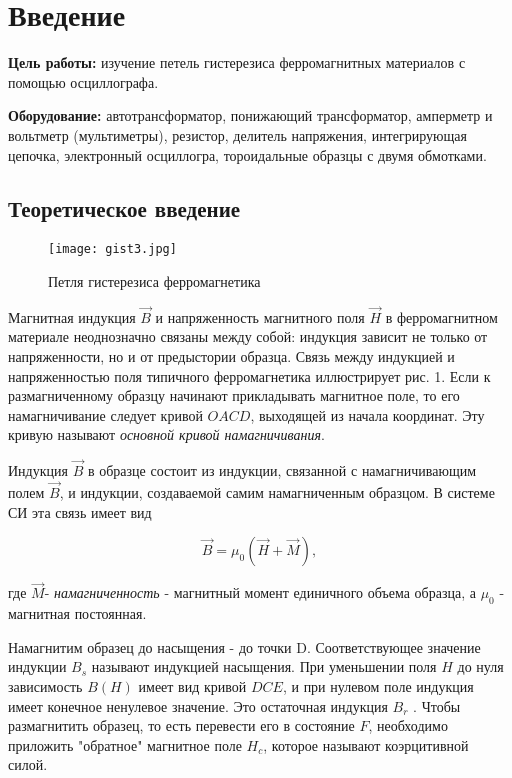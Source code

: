 \section{Введение}

\textbf{Цель работы:}
изучение петель гистерезиса ферромагнитных материалов с помощью осциллографа.

\textbf{Оборудование:}
автотрансформатор, понижающий трансформатор, амперметр и вольтметр (мультиметры), резистор, делитель напряжения, интегрирующая
цепочка, электронный осциллогра, тороидальные образцы с двумя обмотками.

\subsection{Теоретическое введение}

\begin{wrapfigure}{l}{0.6\textwidth}
    \centering
    \vspace{-20pt}
        \texttt{[image: gist3.jpg]}
        \label{fig:sdfsafd}
    \vspace{-10pt}
    \caption{Петля гистерезиса ферромагнетика}
\end{wrapfigure}

Магнитная индукция $\vec{B}$ и напряженность магнитного поля
$\vec{H}$ в ферромагнитном материале неоднозначно связаны
между собой: индукция зависит не только от напряженности, но
и от предыстории образца. Связь между индукцией
и напряженностью поля типичного ферромагнетика иллюстрирует рис. 1. Если
к размагниченному образцу начинают прикладывать магнитное поле, то его намагничивание следует кривой $ OACD $, выходящей
из начала
координат. Эту кривую называют \textit{основной кривой намагничивания}.


Индукция $\vec{B}$ в образце состоит из индукции, связанной с намагничивающим полем
$\vec{B}$, и индукции, создаваемой самим намагниченным
образцом.
В системе СИ эта связь имеет вид

$$\vec{B} = \mu_{0}(\vec{H}+\vec{M}),$$

где $\vec{M}$- \textit{намагниченность} - магнитный момент единичного объема образца, а $\mu_{0}$ - магнитная постоянная.

Намагнитим образец до насыщения - до точки D. Соответствующее
значение индукции $B_{s}$ называют индукцией насыщения. При уменьшении поля $H$ до нуля зависимость $B(H)$ имеет вид кривой $DCE$, и при нулевом поле индукция имеет конечное ненулевое значение. Это остаточная индукция $B_{r}$ . Чтобы размагнитить образец, то есть перевести его в состояние
$F$, необходимо приложить "обратное" магнитное
поле $H_{c}$, которое называют коэрцитивной силой.

